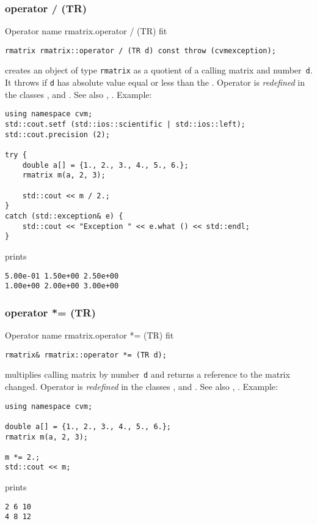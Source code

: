\subsubsection{operator / (TR)}
Operator%
\pdfdest name {rmatrix.operator / (TR)} fit
\begin{verbatim}
rmatrix rmatrix::operator / (TR d) const throw (cvmexception);
\end{verbatim}
creates an object of type \verb"rmatrix" as a quotient of
a calling matrix and  number~\verb"d". It throws
if \verb"d" has  absolute value equal or less than the
.
Operator is \emph{redefined} in the classes
, 
and .
See also ,
.
Example:
\begin{Verbatim}
using namespace cvm;
std::cout.setf (std::ios::scientific | std::ios::left);
std::cout.precision (2);

try {
    double a[] = {1., 2., 3., 4., 5., 6.};
    rmatrix m(a, 2, 3);

    std::cout << m / 2.;
}
catch (std::exception& e) {
    std::cout << "Exception " << e.what () << std::endl;
}
\end{Verbatim}
prints
\begin{Verbatim}
5.00e-01 1.50e+00 2.50e+00
1.00e+00 2.00e+00 3.00e+00
\end{Verbatim}
\newpage



\subsubsection{operator *= (TR)}
Operator%
\pdfdest name {rmatrix.operator *= (TR)} fit
\begin{verbatim}
rmatrix& rmatrix::operator *= (TR d);
\end{verbatim}
multiplies  calling matrix by  number~\verb"d"
and returns a reference to
the matrix changed.
Operator is \emph{redefined} in the classes
, 
and .
See also ,
.
Example:
\begin{Verbatim}
using namespace cvm;

double a[] = {1., 2., 3., 4., 5., 6.};
rmatrix m(a, 2, 3);

m *= 2.;
std::cout << m;
\end{Verbatim}
prints
\begin{Verbatim}
2 6 10
4 8 12
\end{Verbatim}
\newpage



